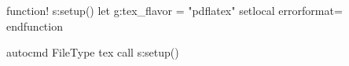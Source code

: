 function! s:setup()
    let g:tex_flavor = "pdflatex"
    setlocal errorformat=%
endfunction

autocmd FileType tex call s:setup()

